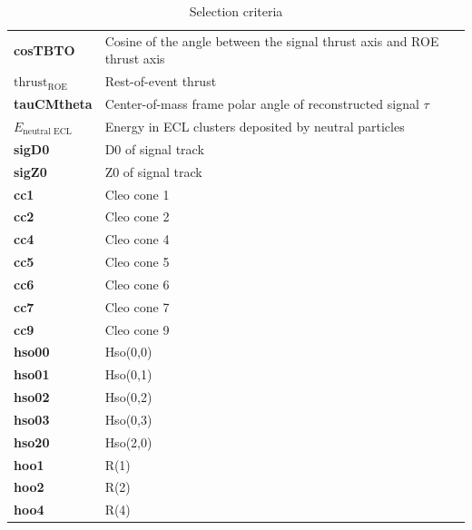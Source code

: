 \documentclass[12pt]{thesis}  %
\begin{document}
\begin{table}[h]
\begin{tabular}{ll}
\textbf{cosTBTO} & Cosine of the angle between the signal thrust axis and ROE thrust axis  \\
$\text{thrust}_{\text{ROE}}$ & Rest-of-event thrust   \\
\textbf{tauCMtheta} & Center-of-mass frame polar angle of reconstructed signal $\tau$ \\
$E_{\text{neutral ECL}}$ & Energy in ECL clusters deposited by neutral particles \\
\textbf{sigD0} & D0 of signal track  \\
\textbf{sigZ0} & Z0 of signal track \\
\textbf{cc1} & Cleo cone 1   \\
\textbf{cc2} & Cleo cone 2 \\
\textbf{cc4} & Cleo cone 4  \\
\textbf{cc5} & Cleo cone 5   \\
\textbf{cc6} & Cleo cone 6  \\
\textbf{cc7} & Cleo cone 7 \\
\textbf{cc9} & Cleo cone 9  \\
\textbf{hso00} & Hso(0,0)  \\
\textbf{hso01} & Hso(0,1)   \\
\textbf{hso02} & Hso(0,2)  \\
\textbf{hso03} & Hso(0,3)  \\
\textbf{hso20} & Hso(2,0)  \\
\textbf{hoo1} & R(1)  \\
\textbf{hoo2} & R(2) \\
\textbf{hoo4} & R(4) \\ \hline
\end{tabular}
\caption{Selection criteria}
\label{tab:selection criteria list}
\end{table}
\end{document}
